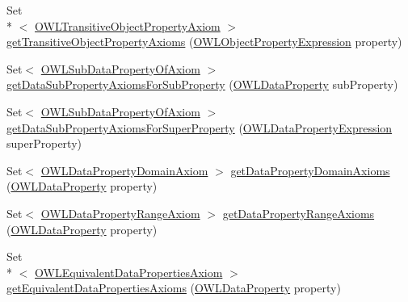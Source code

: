 \begin{DoxyCompactItemize}
\item 
Set\\*
$<$ \hyperlink{interfaceorg_1_1semanticweb_1_1owlapi_1_1model_1_1_o_w_l_transitive_object_property_axiom}{O\-W\-L\-Transitive\-Object\-Property\-Axiom} $>$ \hyperlink{interfaceorg_1_1semanticweb_1_1owlapi_1_1model_1_1_o_w_l_ontology_ad91a55bdee545eb2bc638e82eb28427e}{get\-Transitive\-Object\-Property\-Axioms} (\hyperlink{interfaceorg_1_1semanticweb_1_1owlapi_1_1model_1_1_o_w_l_object_property_expression}{O\-W\-L\-Object\-Property\-Expression} property)
\item 
Set$<$ \hyperlink{interfaceorg_1_1semanticweb_1_1owlapi_1_1model_1_1_o_w_l_sub_data_property_of_axiom}{O\-W\-L\-Sub\-Data\-Property\-Of\-Axiom} $>$ \hyperlink{interfaceorg_1_1semanticweb_1_1owlapi_1_1model_1_1_o_w_l_ontology_a80ca4af05f93296d4d6a344b5e6d2b9c}{get\-Data\-Sub\-Property\-Axioms\-For\-Sub\-Property} (\hyperlink{interfaceorg_1_1semanticweb_1_1owlapi_1_1model_1_1_o_w_l_data_property}{O\-W\-L\-Data\-Property} sub\-Property)
\item 
Set$<$ \hyperlink{interfaceorg_1_1semanticweb_1_1owlapi_1_1model_1_1_o_w_l_sub_data_property_of_axiom}{O\-W\-L\-Sub\-Data\-Property\-Of\-Axiom} $>$ \hyperlink{interfaceorg_1_1semanticweb_1_1owlapi_1_1model_1_1_o_w_l_ontology_a5eaf1cbb1836346020bb91e7af6d048f}{get\-Data\-Sub\-Property\-Axioms\-For\-Super\-Property} (\hyperlink{interfaceorg_1_1semanticweb_1_1owlapi_1_1model_1_1_o_w_l_data_property_expression}{O\-W\-L\-Data\-Property\-Expression} super\-Property)
\item 
Set$<$ \hyperlink{interfaceorg_1_1semanticweb_1_1owlapi_1_1model_1_1_o_w_l_data_property_domain_axiom}{O\-W\-L\-Data\-Property\-Domain\-Axiom} $>$ \hyperlink{interfaceorg_1_1semanticweb_1_1owlapi_1_1model_1_1_o_w_l_ontology_a1e641078a4b187eb250ec28e081c2dec}{get\-Data\-Property\-Domain\-Axioms} (\hyperlink{interfaceorg_1_1semanticweb_1_1owlapi_1_1model_1_1_o_w_l_data_property}{O\-W\-L\-Data\-Property} property)
\item 
Set$<$ \hyperlink{interfaceorg_1_1semanticweb_1_1owlapi_1_1model_1_1_o_w_l_data_property_range_axiom}{O\-W\-L\-Data\-Property\-Range\-Axiom} $>$ \hyperlink{interfaceorg_1_1semanticweb_1_1owlapi_1_1model_1_1_o_w_l_ontology_a6b08b12ca6f2fc6966c693a57225294c}{get\-Data\-Property\-Range\-Axioms} (\hyperlink{interfaceorg_1_1semanticweb_1_1owlapi_1_1model_1_1_o_w_l_data_property}{O\-W\-L\-Data\-Property} property)
\item 
Set\\*
$<$ \hyperlink{interfaceorg_1_1semanticweb_1_1owlapi_1_1model_1_1_o_w_l_equivalent_data_properties_axiom}{O\-W\-L\-Equivalent\-Data\-Properties\-Axiom} $>$ \hyperlink{interfaceorg_1_1semanticweb_1_1owlapi_1_1model_1_1_o_w_l_ontology_a3eb9d13459af08b9ad78368ae9118db8}{get\-Equivalent\-Data\-Properties\-Axioms} (\hyperlink{interfaceorg_1_1semanticweb_1_1owlapi_1_1model_1_1_o_w_l_data_property}{O\-W\-L\-Data\-Property} property)

\end{DoxyCompactItemize}
